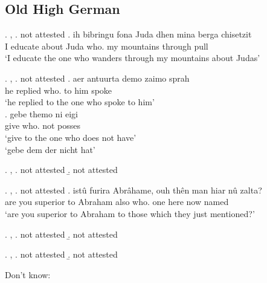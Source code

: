 \subsection{Old High German}


\ex. , 
\a.  not attested
\bg. ih bibringu fona Juda dhen mina berga chisetzit\\
 I educate\scsub{[acc]} about Juda who. my mountains {through pull}\scsub{[nom]}\\
 `I educate the one who wanders through my mountains about Judas' 

\ex. , 
\a.  not attested
\bg. aer antuurta demo zaimo sprah\\
 he replied\scsub{[dat]} who. {to him} spoke\scsub{[nom]}\\
 `he replied to the one who spoke to him' \\
\bg. gebe themo ni eigi\\
 give\scsub{[dat]} who. not posses\scsub{[nom]}\\
 `give to the one who does not have' \\
 `gebe dem der nicht hat' 

\ex. , 
\a.  not attested
\b.  not attested

\ex. , 
\a.  not attested
\bg. istû furira Abrâhame, ouh thên man hiar nû zalta?\\
 {are you} superior\scsub{[dat]} {to Abraham} also who. one here now named\scsub{[acc]}\\
 `are you superior to Abraham to those which they just mentioned?' 

\ex. , 
\a.  not attested
\b.  not attested

\ex. , 
\a.  not attested
\b.  not attested





Don't know:

